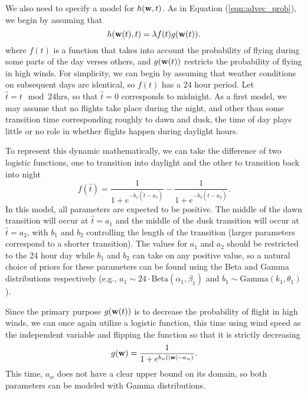 \documentclass[12pt,english]{article}
\begin{document}
We also need to specify a model for $h(\mathbf{w},t)$. As in Equation (\ref{eqn:advec_prob}), we begin by assuming that
\begin{equation*}
h(\mathbf{w}(t),t) = \lambda f(t)g(\mathbf{w}(t)).
\end{equation*}
where $f(t)$ is a function that takes into account the probability of flying during some parts of the day verses others, and $g(\mathbf{w}(t))$ restricts the probability of flying in high winds. For simplicity, we can begin by assuming that weather conditions on subsequent days are identical, so $f(t)$ has a 24 hour period. Let $\hat{t} = t\mod 24\mbox{hrs}$, so that $\hat{t}=0$ corresponds to midnight. As a first model, we may assume that no flights take place during the night, and other than some transition time corresponding roughly to dawn and dusk, the time of day plays little or no role in whether flights happen during daylight hours.

To represent this dynamic mathematically, we can take the difference of two logistic functions, one to transition into daylight and the other to transition back into night
\begin{equation}
f(\hat{t}) = \frac{1}{1 + e^{-b_1(\hat{t} - a_1)}} - \frac{1}{1 + e^{-b_2(\hat{t} - a_2)}}.
\end{equation}
In this model, all parameters are expected to be positive. The middle of the dawn transition will occur at $\hat{t}=a_1$ and the middle of the dusk transition will occur at $\hat{t}=a_2$, with $b_1$ and $b_2$ controlling the length of the transition (larger parameters correspond to a shorter transition). The values for $a_1$ and $a_2$ should be restricted to the 24 hour day while $b_1$ and $b_2$ can take on any positive value, so a natural choice of priors for these parameters can be found using the Beta and Gamma distributions respectively (e.g., $a_1\sim 24\cdot\mbox{Beta}(\alpha_1,\beta_1)$ and $b_1\sim\mbox{Gamma}(k_1,\theta_1)$).

Since the primary purpose $g(\mathbf{w}(t))$ is to decrease the probability of flight in high winds, we can once again utilize a logistic function, this time using wind speed as the independent variable and flipping the function so that it is strictly decreasing
\begin{equation}
g(\mathbf{w}) = \frac{1}{1 + e^{b_w(|\mathbf{w}| - a_w)}}.
\end{equation}
This time, $a_w$ does not have a clear upper bound on its domain, so both parameters can be modeled with Gamma distributions.
\end{document}
